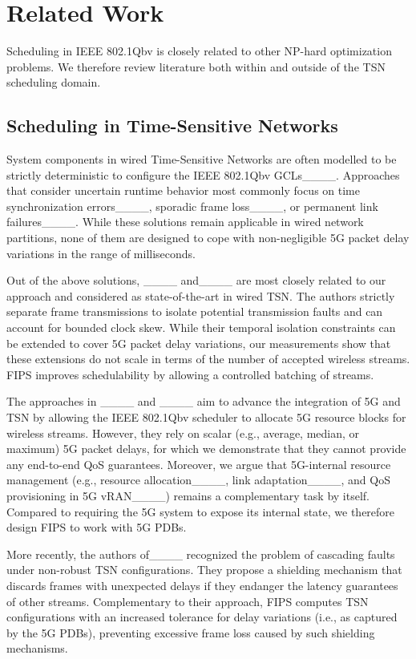 \section{Related Work}
\label{sec:related_work}
Scheduling in IEEE 802.1Qbv is closely related to other NP-hard optimization problems.
We therefore review literature both within and outside of the TSN scheduling domain.

\subsection{Scheduling in Time-Sensitive Networks}
System components in wired Time-Sensitive Networks are often modelled to be strictly deterministic to configure the IEEE 802.1Qbv GCLs____.
Approaches that consider uncertain runtime behavior most commonly focus on time synchronization errors____, sporadic frame loss____, or permanent link failures____.
While these solutions remain applicable in wired network partitions, none of them are designed to cope with non-negligible 5G packet delay variations in the range of milliseconds.

Out of the above solutions, ____ and____ are most closely related to our approach and considered as state-of-the-art in wired TSN.
The authors strictly separate frame transmissions to isolate potential transmission faults and can account for bounded clock skew.
While their temporal isolation constraints can be extended to cover 5G packet delay variations, our measurements show that these extensions do not scale in terms of the number of accepted wireless streams.
FIPS improves schedulability by allowing a controlled batching of streams.

The approaches in ____ and ____ aim to advance the integration of 5G and TSN by allowing the IEEE 802.1Qbv scheduler to allocate 5G resource blocks for wireless streams.
However, they rely on scalar (e.g., average, median, or maximum) 5G packet delays, for which we demonstrate that they cannot provide any end-to-end QoS guarantees. 
Moreover, we argue that 5G-internal resource management (e.g., resource allocation____, link adaptation____, and QoS provisioning in 5G vRAN____) remains a complementary task by itself.
Compared to requiring the 5G system to expose its internal state, we therefore design FIPS to work with 5G PDBs.

More recently, the authors of____ recognized the problem of cascading faults under non-robust TSN configurations.
They propose a shielding mechanism that discards frames with unexpected delays if they endanger the latency guarantees of other streams.
Complementary to their approach, FIPS computes TSN configurations with an increased tolerance for delay variations (i.e., as captured by the 5G PDBs), preventing excessive frame loss caused by such shielding mechanisms.

